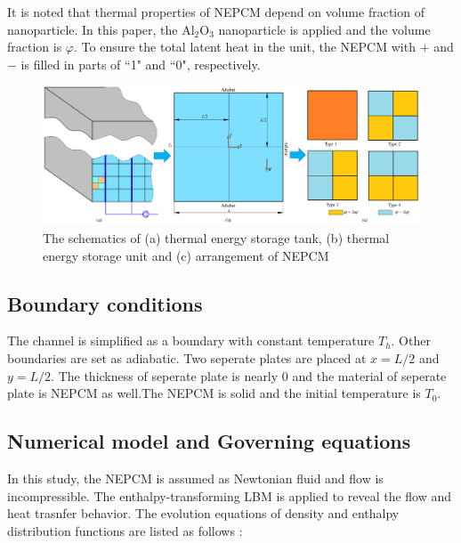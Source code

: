 \documentclass[preprint,12pt]{elsarticle}
\begin{document}
It is noted that thermal properties of NEPCM depend on volume fraction of nanoparticle. In this paper, the Al$_2$O$_3$ nanoparticle is applied and the volume fraction is $\varphi$. To ensure the total latent heat in the unit, the NEPCM with $+$ and $-$ is filled in parts of ``1" and ``0", respectively.

\begin{figure}[H] 
	\centering
	\includegraphics[scale=0.4]{Fig/Numerical_Model.png}

	\caption{The schematics of (a) thermal energy storage tank, (b) thermal energy storage unit and (c) arrangement of NEPCM } 
	\label{Fig_Numerical_Model}
\end{figure}

\subsection{Boundary conditions}
The channel is simplified as a boundary with constant temperature $T_h$. Other boundaries are set as adiabatic. Two seperate plates are placed at $x=L/2$ and $y=L/2$. The thickness of seperate plate is nearly 0 and the material of seperate plate is NEPCM as well.The NEPCM is solid and the initial temperature is $T_0$.

\subsection{Numerical model and Governing equations}

In this study, the NEPCM is assumed as Newtonian fluid and flow is incompressible. The enthalpy-transforming LBM is applied to reveal the flow and heat trasnfer behavior. The evolution equations of density and enthalpy distribution functions are listed as follows \cite{RN25,RN847}:
\end{document}
